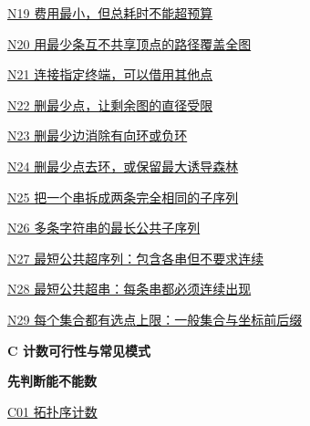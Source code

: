 \documentclass[10pt,a4paper]{article}
\begin{document}
\noindent\hyperref[N19]{N19 费用最小，但总耗时不能超预算\nobreak\hfill\pageref*{N19}}\par\vspace{1.5pt}
\noindent\hyperref[N20]{N20 用最少条互不共享顶点的路径覆盖全图\nobreak\hfill\pageref*{N20}}\par\vspace{1.5pt}
\noindent\hyperref[N21]{N21 连接指定终端，可以借用其他点\nobreak\hfill\pageref*{N21}}\par\vspace{1.5pt}
\noindent\hyperref[N22]{N22 删最少点，让剩余图的直径受限\nobreak\hfill\pageref*{N22}}\par\vspace{1.5pt}
\noindent\hyperref[N23]{N23 删最少边消除有向环或负环\nobreak\hfill\pageref*{N23}}\par\vspace{1.5pt}
\noindent\hyperref[N24]{N24 删最少点去环，或保留最大诱导森林\nobreak\hfill\pageref*{N24}}\par\vspace{1.5pt}
\noindent\hyperref[N25]{N25 把一个串拆成两条完全相同的子序列\nobreak\hfill\pageref*{N25}}\par\vspace{1.5pt}
\noindent\hyperref[N26]{N26 多条字符串的最长公共子序列\nobreak\hfill\pageref*{N26}}\par\vspace{1.5pt}
\noindent\hyperref[N27]{N27 最短公共超序列：包含各串但不要求连续\nobreak\hfill\pageref*{N27}}\par\vspace{1.5pt}
\noindent\hyperref[N28]{N28 最短公共超串：每条串都必须连续出现\nobreak\hfill\pageref*{N28}}\par\vspace{1.5pt}
\noindent\hyperref[N29]{N29 每个集合都有选点上限：一般集合与坐标前后缀\nobreak\hfill\pageref*{N29}}\par\vspace{1.5pt}
\par\vspace{6pt}\textbf{C 计数可行性与常见模式}\par\vspace{3pt}
\par\vspace{3pt}\textbf{先判断能不能数}\par
\noindent\hyperref[C01]{C01 拓扑序计数\nobreak\hfill\pageref*{C01}}\par\vspace{1.5pt}
\end{document}
